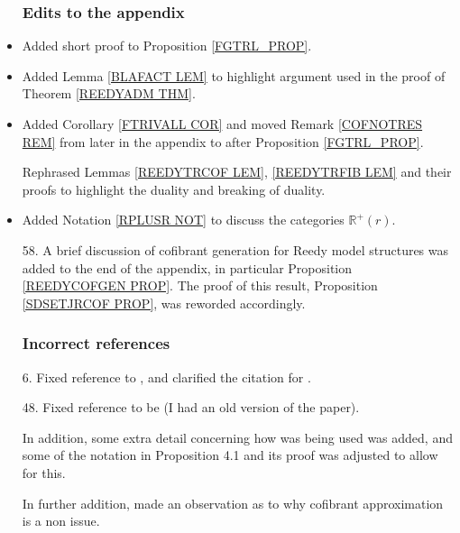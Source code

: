 \documentclass{article}
\begin{document}
\begin{itemize}
      
      
      \subsubsection*{Edits to the appendix}
\item Added short proof to Proposition \ref{FGTRL_PROP}. %

\item Added Lemma \ref{BLAFACT LEM} to highlight argument used in the proof of Theorem \ref{REEDYADM THM}.
            
\item Added Corollary \ref{FTRIVALL COR} and moved Remark \ref{COFNOTRES REM} from later in the appendix to after Proposition \ref{FGTRL_PROP}.

      Rephrased Lemmas \ref{REEDYTRCOF LEM}, \ref{REEDYTRFIB LEM} and their proofs to highlight the duality and breaking of duality.
      
\item Added Notation \ref{RPLUSR NOT} to discuss the categories $\mathbb R^+(r)$.
      
\item[58.] A brief discussion of cofibrant generation for Reedy model structures was added to the end of the appendix, in particular Proposition \ref{REEDYCOFGEN PROP}. The proof of this result, Proposition \ref{SDSETJRCOF PROP}, was reworded accordingly. %


      

      \subsubsection*{Incorrect references}
      
\item[6.] Fixed reference \cite[Prop. 3.21]{BP17} to \cite[Prop. 3.23]{BP17}, and clarified the citation for \cite{BP17}.

\item[48.] Fixed reference \cite[Prop. 3.4.18]{Hir03} to be \cite[Thm. 3.3.18]{Hir03} (I had an old version of the paper).
      
      In addition, some extra detail concerning how \cite[Prop. 3.3.18]{Hir03} was being used was added, and some of the notation in Proposition 4.1 and its proof was adjusted to allow for this.
      
      In further addition, made an observation as to why cofibrant approximation is a non issue.
      

\end{itemize}
\end{document}
